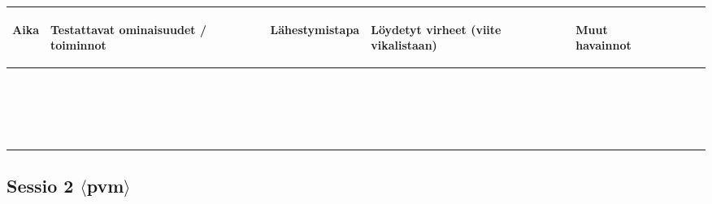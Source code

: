 \begin{landscape}
\begin{longtable}{|>{\raggedright}p{2.4cm}|>{\raggedright}p{5.7cm}|>{\raggedright}p{4.2cm}|>{\raggedright}p{4.2cm}|p{4.2cm}|}
	\hline
	\begin{bfseries}Aika\end{bfseries} & \begin{bfseries}Testattavat ominaisuudet / toiminnot\end{bfseries} & \begin{bfseries}Lähestymistapa\end{bfseries} & \begin{bfseries}Löydetyt virheet (viite vikalistaan)\end{bfseries} & \begin{bfseries}Muut havainnot\end{bfseries} \endhead
	\hline
	 &  &  &  &  \\
	\hline
	 &  &  &  &  \\
	\hline
	 &  &  &  &  \\
	\hline
	 &  &  &  &  \\
	\hline
	 &  &  &  &  \\
	\hline
	 &  &  &  &  \\
	\hline
	 &  &  &  &  \\
	\hline
	 &  &  &  &  \\
	\hline
	 &  &  &  &  \\
	\hline
	 &  &  &  &  \\
	\hline
	 &  &  &  &  \\
	\hline
	 &  &  &  &  \\
	\hline
	 &  &  &  &  \\
	\hline
	 &  &  &  &  \\
	\hline
	 &  &  &  &  \\
	\hline
	 &  &  &  &  \\
	\hline
	 &  &  &  &  \\
	\hline
	 &  &  &  &  \\
	\hline
	 &  &  &  &  \\
	\hline
	 &  &  &  &  \\
	\hline
\end{longtable}

\subsection{Sessio 2 $\langle$pvm$\rangle$}


\end{landscape}
